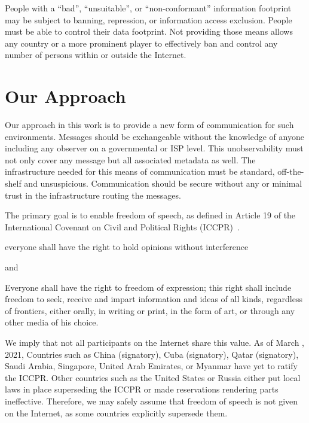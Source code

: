 People with a ``bad'', ``unsuitable'', or ``non-conformant'' information footprint may be subject to banning, repression, or information access exclusion. People must be able to control their data footprint. Not providing those means allows any country or a more prominent player to effectively ban and control any number of persons within or outside the Internet. 

\section{Our Approach}
Our approach in this work is to provide a new form of communication for such environments. Messages should be exchangeable without the knowledge of anyone including any observer on a governmental or ISP level. This unobservability must not only cover any message but all associated metadata as well. The infrastructure needed for this means of communication must be standard, off-the-shelf and unsuspicious. Communication should be secure without any or minimal trust in the infrastructure routing the messages.

The primary goal is to enable freedom of speech, as defined in Article 19 of the International Covenant on Civil and Political Rights (ICCPR)~\cite{iccpr}.
\begin{shadequote}{}
		everyone shall have the right to hold opinions without interference 
\end{shadequote}
and
\begin{shadequote}{}
	Everyone shall have the right to freedom of expression; this right shall include freedom to seek, receive and impart information and ideas of all kinds, regardless of frontiers, either orally, in writing or print, in the form of art, or through any other media of his choice.
\end{shadequote}

We imply that not all participants on the Internet share this value. As of March , 2021, Countries such as China (signatory), Cuba (signatory), Qatar (signatory), Saudi Arabia, Singapore, United Arab Emirates, or Myanmar have yet to ratify the ICCPR. Other countries such as the United States or Russia either put local laws in place superseding the ICCPR or made reservations rendering parts ineffective. Therefore, we may safely assume that freedom of speech is not given on the Internet, as some countries explicitly supersede them.

